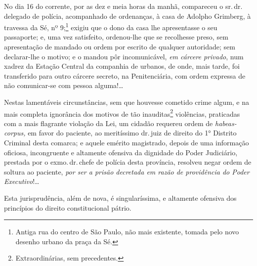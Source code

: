 \asterisc

No dia 16 do corrente, por as dez e meia horas da manhã, compareceu o
sr.\,dr.\,delegado de polícia, acompanhado de ordenanças, à casa de
Adolpho Grimberg, à travessa da Sé, nº 9;\footnote{Antiga rua do
  centro de São Paulo, não mais existente, tomada pelo novo desenho
  urbano da praça da Sé.} exigiu que o dono da casa lhe apresentasse o
seu passaporte; e, uma vez satisfeito, ordenou-lhe que se recolhesse
preso, sem apresentação de mandado ou ordem por escrito de qualquer
autoridade; sem declarar-lhe o motivo; e o mandou pôr incomunicável,
\emph{em cárcere privado}, num xadrez da Estação Central da companhia de
urbanos, de onde, mais tarde, foi transferido para outro cárcere
secreto, na Penitenciária, com ordem expressa de não comunicar-se com
pessoa alguma!\ldots{}

Nestas lamentáveis circunstâncias, sem que houvesse cometido crime
algum, e na mais completa ignorância dos motivos de tão
inauditas\footnote{Extraordinárias, sem precedentes.} violências,
praticadas com a mais flagrante violação da Lei, um cidadão requereu
ordem de \emph{habeas-corpus,} em favor do paciente, ao meritíssimo dr.\,juiz de direito do 1° Distrito Criminal desta comarca; e aquele emérito
magistrado, depois de uma informação oficiosa, incongruente e altamente
ofensiva da dignidade do Poder Judiciário, prestada por o exmo.\,dr.\,chefe de polícia desta província, resolveu negar ordem de soltura ao
paciente, \emph{por ser a prisão decretada em razão de providência do
Poder Executivo}!\ldots{}

Esta jurisprudência, além de nova, é singularíssima, e altamente
ofensiva dos princípios do direito constitucional pátrio.

